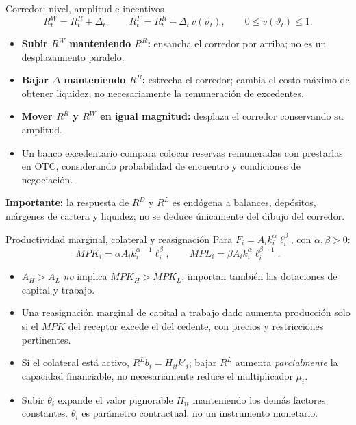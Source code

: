 \documentclass[aspectratio=169,11pt]{beamer}
\begin{document}
\begin{frame}{Corredor: nivel, amplitud e incentivos}
\small
\[
R^W_t=R^R_t+\Delta_t,\qquad
R^F_t=R^R_t+\Delta_t\,v(\vartheta_t),\qquad 0\leq v(\vartheta_t)\leq 1.
\]
\begin{itemize}
\item \textbf{Subir $R^W$ manteniendo $R^R$:} ensancha el corredor por arriba; no es un desplazamiento paralelo.
\item \textbf{Bajar $\Delta$ manteniendo $R^R$:} estrecha el corredor; cambia el costo máximo de obtener liquidez, no necesariamente la remuneración de excedentes.
\item \textbf{Mover $R^R$ y $R^W$ en igual magnitud:} desplaza el corredor conservando su amplitud.
\item Un banco excedentario compara colocar reservas remuneradas con prestarlas en OTC, considerando probabilidad de encuentro y condiciones de negociación.
\end{itemize}
\textbf{Importante:} la respuesta de $R^D$ y $R^L$ es endógena a balances, depósitos, márgenes de cartera y liquidez; no se deduce únicamente del dibujo del corredor.
\end{frame}

\begin{frame}{Productividad marginal, colateral y reasignación}
\small
Para $F_i=A_i k_i^\alpha \ell_i^\beta$, con $\alpha,\beta>0$:
\[
MPK_i=\alpha A_i k_i^{\alpha-1}\ell_i^\beta,\qquad
MPL_i=\beta A_i k_i^\alpha\ell_i^{\beta-1}.
\]
\begin{itemize}
\item $A_H>A_L$ \emph{no} implica $MPK_H>MPK_L$: importan también las dotaciones de capital y trabajo.
\item Una reasignación marginal de capital a trabajo dado aumenta producción solo si el $MPK$ del receptor excede el del cedente, con precios y restricciones pertinentes.
\item Si el colateral está activo, $R^L b_i=H_{it}k'_i$; bajar $R^L$ aumenta \emph{parcialmente} la capacidad financiable, no necesariamente reduce el multiplicador $\mu_i$.
\item Subir $\theta_i$ expande el valor pignorable $H_{it}$ manteniendo los demás factores constantes. $\theta_i$ es parámetro contractual, no un instrumento monetario.
\end{itemize}
\end{frame}
\end{document}
